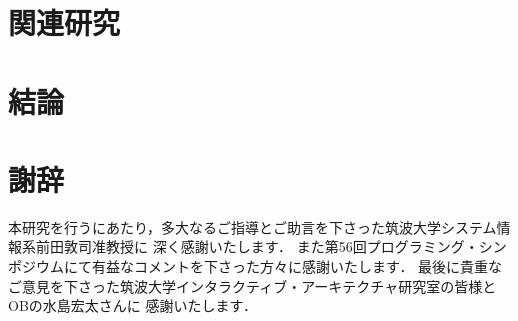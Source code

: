 \documentclass[a4paper,11pt,dvipdfmx]{jreport}
\makeatletter
\renewenvironment{thebibliography}[1]%
{\chapter*{\bibname\@mkboth{\bibname}{\bibname}}%
	\addcontentsline{toc}{chapter}{\numberline{}\bibname}%
	\list{\@biblabel{\@arabic\c@enumiv}}%
	{\settowidth\labelwidth{\@biblabel{#1}}%
		\leftmargin\labelwidth
		\advance\leftmargin\labelsep
		\@openbib@code
		\usecounter{enumiv}%
		\let\p@enumiv\@empty
		\renewcommand\theenumiv{\@arabic\c@enumiv}}%
	\sloppy
	\clubpenalty4000
	\@clubpenalty\clubpenalty
	\widowpenalty4000%
	\sfcode`\.\@m}
{\def\@noitemerr
	{\@latex@warning{Empty `thebibliography' environment}}%
	\endlist}
\makeatother
\begin{document}
\chapter{関連研究}
\label{chapter:related-work}


\chapter{結論}
\label{chapter:conclusion}


\chapter*{謝辞}

本研究を行うにあたり，多大なるご指導とご助言を下さった筑波大学システム情報系前田敦司准教授に
深く感謝いたします．
また第56回プログラミング・シンポジウムにて有益なコメントを下さった方々に感謝いたします．
最後に貴重なご意見を下さった筑波大学インタラクティブ・アーキテクチャ研究室の皆様とOBの水島宏太さんに
感謝いたします．

\newpage

\renewcommand{\bibname}{参考文献}




%
%
\end{document}
